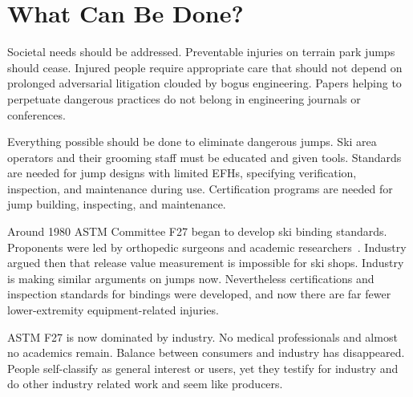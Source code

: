 \documentclass[smallextended]{svjour3}       %
\begin{document}
\section{What Can Be Done?}
\label{sec:action}
%
Societal needs should be addressed. Preventable injuries on terrain park jumps
should cease. Injured people require appropriate care that should not depend on
prolonged adversarial litigation clouded by bogus engineering. Papers helping to
perpetuate dangerous practices do not belong in engineering journals or
conferences.

Everything possible should be done to eliminate dangerous jumps. Ski area
operators and their grooming staff must be educated and given tools. Standards
are needed for jump designs with limited EFHs, specifying verification,
inspection, and maintenance during use. Certification programs are needed for
jump building, inspecting, and maintenance.

Around 1980 ASTM Committee F27 began to develop ski binding standards. Proponents
were led by orthopedic surgeons and academic researchers~\cite{Bahniuk1996}.
Industry argued then that release value measurement is impossible for ski
shops. Industry is making similar arguments on jumps now. Nevertheless
certifications and inspection standards for bindings were developed, and now
there are far fewer lower-extremity equipment-related injuries.

ASTM F27 is now dominated by industry. No medical professionals and almost no
academics remain. Balance between consumers and industry has disappeared. People
self-classify as general interest or users, yet they testify for industry and
do other industry related work and seem like producers.

\end{document}
